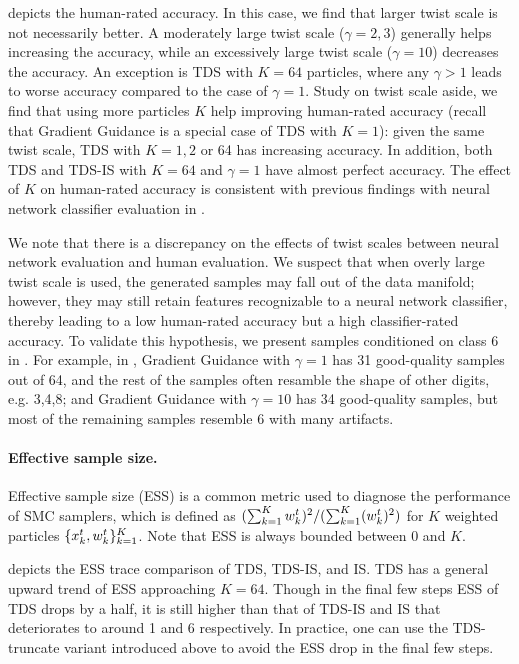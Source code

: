  depicts the human-rated accuracy. In this case, we find that larger twist scale is not necessarily better. A moderately large twist scale ($\gamma=2,3$) generally helps increasing the accuracy, while an excessively large twist scale ($\gamma =10$) decreases the accuracy. An exception is TDS with $K=64$ particles, where any $\gamma >1$ leads to worse accuracy compared to the case of $\gamma=1$.  Study on twist scale aside, we find that using more particles $K$ help improving human-rated accuracy (recall that Gradient Guidance is a special case of TDS with $K=1$): given the same twist scale, TDS with $K=1,2$ or 64 has increasing accuracy.  In addition, both TDS and TDS-IS with $K=64$ and $\gamma=1$ have almost perfect accuracy. The effect of $K$ on human-rated accuracy is consistent with previous findings with neural network classifier evaluation in . 

We note that there is a discrepancy on the effects of twist scales between neural network evaluation and human evaluation. We suspect that when overly large twist scale is used, the generated samples may fall out of the data manifold; however, they may still retain features recognizable to a neural network classifier, thereby leading to a low human-rated accuracy but a high classifier-rated accuracy. To validate this hypothesis, 
we present samples conditioned on class 6 in . For example, in ,  Gradient Guidance with $\gamma=1$ has 31 good-quality samples out of 64, and the rest of the samples often resamble the shape of other digits, e.g. 3,4,8; and Gradient Guidance with $\gamma=10$ has 34 good-quality samples, but most of the remaining samples resemble 6 with many artifacts. 

\paragraph{Effective sample size.} Effective sample size (ESS) is a common
metric used to diagnose the performance of SMC samplers, which is defined as 
 $ (\sum_{k=1}^K w^{t}_k)^2 / (\sum_{k=1}^K (w^{t}_k)^2 )$ for $K$ weighted particles  $\{x^{t}_k, w^{t}_k\}_{k=1}^K$. 
Note that ESS is always bounded between $0$ and $K$.

 depicts the ESS trace comparison of TDS, TDS-IS, and IS. TDS has a general upward trend of ESS approaching $K = 64$. Though in the final few steps ESS of TDS drops by a half, it is still higher than that of TDS-IS and IS that deteriorates to around 1 and 6 respectively. In practice, one can use the TDS-truncate variant introduced above to avoid the ESS drop in the final few steps. 

